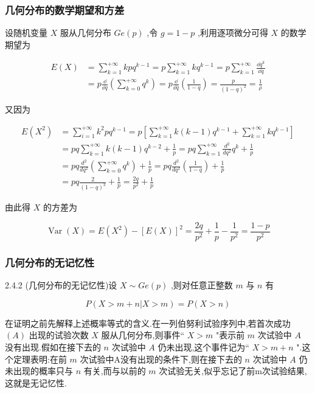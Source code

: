\subsubsection{几何分布的数学期望和方差}

设随机变量 $ X $ 服从几何分布 $ Ge(p) $ ,令 $ g=1-p $ ,利用逐项微分可得 $ X $ 的数学期望为

\[
\begin{aligned} E(X) &=\sum_{k=1}^{+\infty} k p q^{k-1} =p \sum_{k=1}^{+\infty} k q^{k-1}=p \sum_{k=1}^{+\infty} \frac{\dd q^{k}}{\dd q} \\ &=p \frac{\dd}{\dd q}\left(\sum_{k=0}^{+\infty} q^{k}\right)=p \frac{\dd}{\dd q}\left(\frac{1}{1-q}\right)=\frac{p}{(1-q)^{2}}=\frac{1}{\rho} \end{aligned}
\]

又因为

\[
\begin{aligned} 
E\left(X^{2}\right) &=\sum_{i=1}^{+\infty} k^{2} p q^{k-1}=p\left[\sum_{k=1}^{+\infty} k(k-1) q^{k-1}+\sum_{k=1}^{+\infty} k q^{k-1}\right] \\ 
&=p q \sum_{k=1}^{+\infty} k(k-1) q^{k-2}+\frac{1}{p}=p q \sum_{k=1}^{+\infty} \frac{d^{2}}{d q^{2}} q^{k}+\frac{1}{p}\\
&  {=p q \frac{d^{2}}{d q^{2}}\left(\sum_{k=0}^{+\infty} q^{k}\right)+\frac{1}{p}=p q \frac{d^{2}}{d q^{2}}\left(\frac{1}{1-q}\right)+\frac{1}{p}}\\
& {=p q \frac{2}{(1-q)^{3}}+\frac{1}{p}=\frac{2 q}{p^{2}}+\frac{1}{p}}
\end{aligned}
\]

由此得 $ X $ 的方差为

\[
\operatorname{Var}(X)=E\left(X^{2}\right)-[E(X)]^{2}=\frac{2 q}{p^{2}}+\frac{1}{p}-\frac{1}{p^{2}}=\frac{1-p}{p^{2}}
\]


\subsubsection{几何分布的无记忆性}

\begin{theorem}{}{2.4.2}
	(几何分布的无记忆性)设 $ X \sim G e(p) $ ,则对任意正整数 $ m $ 与 $ n $ 有
	
	\begin{equation}
	P(X>m+n | X>m)=P(X>n) \label{eq:2.4.9}
	\end{equation}
\end{theorem}

在证明之前先解释上述概率等式的含义.在一列伯努利试验序列中,若首次成功 $ (A) $ 出现的试验次数 $ X $ 服从几何分布,则事件`` $ X>m $ "表示前 $ m $ 次试验中 $ A $ 没有出现.假如在接下去的 $ n $ 次试验中 $ A $ 仍未出现,这个事件记为`` $ X>m+n $ ".这个定理表明:在前 $ m $ 次试验中A没有出现的条件下,则在接下去的 $ n $ 次试验中 $ A $ 仍未出现的概率只与 $ n $ 有关,而与以前的 $ m $ 次试验无关,似乎忘记了前m次试验结果,这就是无记忆性.


